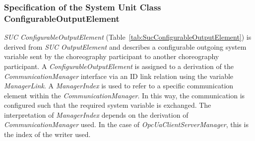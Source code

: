\subsubsection{Specification of the System Unit Class ConfigurableOutputElement}

\emph{SUC ConfigurableOutputElement} (Table~\ref{tab:SucConfigurableOutputElement}) is derived from \emph{SUC OutputElement} and describes a configurable outgoing system variable sent by the choreography participant to another choreography participant. A \emph{ConfigurableOutputElement} is assigned to a derivation of the \emph{CommunicationManager} interface via an ID link relation using the variable \emph{ManagerLink}. A \emph{ManagerIndex} is used to refer to a specific communication element within the \emph{CommunicationManager}. In this way, the communication is configured such that the required system variable is exchanged. The interpretation of \emph{ManagerIndex} depends on the derivation of \emph{CommunicationManager} used. In the case of \emph{OpcUaClientServerManager}, this is the index of the writer used.

